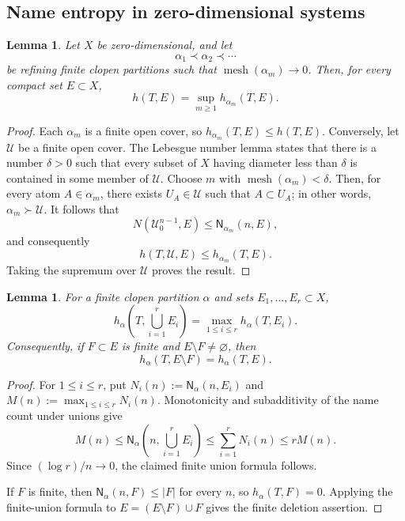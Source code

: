 \documentclass[12pt,letterpaper,reqno]{amsart}
\newcommand{\cU}{\mathcal U}
\newcommand{\mesh}{\operatorname{mesh}}
\newcommand{\Nname}{\mathsf N}
\newtheorem{lemma}[theorem]{Lemma}
\theoremstyle{definition}
\theoremstyle{remark}
\numberwithin{equation}{section}
\begin{document}
	\subsection{Name entropy in zero-dimensional systems}
	\label{sec:name-entropy}
	
	\begin{lemma}
		\label{lem:clopen-detects}
		Let $X$ be zero-dimensional, and let
		\[
		\alpha_1\prec\alpha_2\prec\cdots
		\]
		be refining finite clopen partitions such that
		$\mesh(\alpha_m)\to0$. Then, for every compact set $E\subset X$,
		\[
		h(T,E)=\sup_{m\geq1}h_{\alpha_m}(T,E).
		\]
	\end{lemma}
	
	\begin{proof}
		Each $\alpha_m$ is a finite open cover, so
		$h_{\alpha_m}(T,E)\leq h(T,E)$.  Conversely, let $\cU$ be a finite open
		cover.  The Lebesgue number lemma states that there is a number $\delta>0$
		such that every subset of $X$ having diameter less than $\delta$ is contained
		in some member of $\cU$.  Choose $m$ with $\mesh(\alpha_m)<\delta$.  Then,
		for every atom $A\in\alpha_m$, there exists $U_A\in\cU$ such that
		$A\subset U_A$; in other words, $\alpha_m\succ\cU$.  It follows that
		\[
			N(\cU_0^{n-1},E)
			\leq
			\Nname_{\alpha_m}(n,E),
		\]
		and consequently
		\[
		h(T,\cU,E)\leq h_{\alpha_m}(T,E).
		\]
		Taking the supremum over $\cU$ proves the result.
	\end{proof}
	
	\begin{lemma}
		\label{lem:finite-union}
		For a finite clopen partition $\alpha$ and sets $E_1,\ldots,E_r\subset X$,
		\[
		h_\alpha\left(T,\bigcup_{i=1}^rE_i\right)
		=
		\max_{1\leq i\leq r}h_\alpha(T,E_i).
		\]
		Consequently, if $F\subset E$ is finite and $E\setminus F\neq\varnothing$,
		then
		\[
		h_\alpha(T,E\setminus F)=h_\alpha(T,E).
		\]
	\end{lemma}
	
	\begin{proof}
		For $1\leq i\leq r$, put
		$N_i(n):=\Nname_\alpha(n,E_i)$ and
		$M(n):=\max_{1\leq i\leq r}N_i(n)$.  Monotonicity and subadditivity of the
		name count under unions give
		\[
		M(n)
		\leq
		\Nname_\alpha\left(n,\bigcup_{i=1}^rE_i\right)
		\leq
		\sum_{i=1}^rN_i(n)
		\leq
		rM(n).
		\]
		Since $(\log r)/n\to0$, the claimed finite union formula follows.

		If $F$ is finite, then $\Nname_\alpha(n,F)\leq|F|$ for every $n$, so
		$h_\alpha(T,F)=0$.  Applying the finite-union formula to
		$E=(E\setminus F)\cup F$ gives the finite deletion assertion.
	\end{proof}
	
\end{document}
